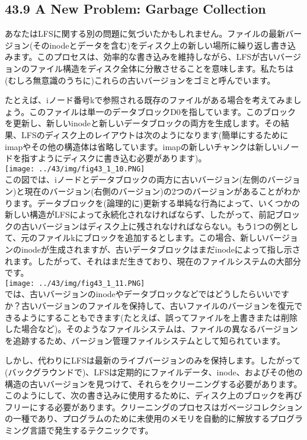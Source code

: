 \hypertarget{a-new-problem-garbage-collection}{%
\subsection*{43.9 A New Problem: Garbage
Collection}\label{a-new-problem-garbage-collection}}

あなたはLFSに関する別の問題に気づいたかもしれません。ファイルの最新バージョン(そのinodeとデータを含む)をディスク上の新しい場所に繰り返し書き込みます。このプロセスは、効率的な書き込みを維持しながら、LFSが古いバージョンのファイル構造をディスク全体に分散させることを意味します。私たちは(むしろ無意識のうちに)これらの古いバージョンをゴミと呼んでいます。

たとえば、iノード番号kで参照される既存のファイルがある場合を考えてみましょう。このファイルは単一のデータブロックD0を指しています。このブロックを更新し、新しいinodeと新しいデータブロックの両方を生成します。その結果、LFSのディスク上のレイアウトは次のようになります(簡単にするためにimapやその他の構造体は省略しています。imapの新しいチャンクは新しいiノードを指すようにディスクに書き込む必要があります)。\\
\texttt{[image: ../43/img/fig43\_1\_10.PNG]}\\
この図では、iノードとデータブロックの両方に古いバージョン(左側のバージョン)と現在のバージョン(右側のバージョン)の2つのバージョンがあることがわかります。データブロックを(論理的に)更新する単純な行為によって、いくつかの新しい構造がLFSによって永続化されなければならず、したがって、前記ブロックの古いバージョンはディスク上に残されなければならない。もう1つの例として、元のファイルkにブロックを追加するとします。この場合、新しいバージョンのinodeが生成されますが、古いデータブロックはまだinodeによって指し示されます。したがって、それはまだ生きており、現在のファイルシステムの大部分です。\\
\texttt{[image: ../43/img/fig43\_1\_11.PNG]}\\
では、古いバージョンのinodeやデータブロックなどではどうしたらいいですか？古いバージョンのファイルを保持して、古いファイルのバージョンを復元できるようにすることもできます(たとえば、誤ってファイルを上書きまたは削除した場合など)。そのようなファイルシステムは、ファイルの異なるバージョンを追跡するため、バージョン管理ファイルシステムとして知られています。

しかし、代わりにLFSは最新のライブバージョンのみを保持します。したがって(バックグラウンドで)、LFSは定期的にファイルデータ、inode、およびその他の構造の古いバージョンを見つけて、それらをクリーニングする必要があります。このようにして、次の書き込みに使用するために、ディスク上のブロックを再びフリーにする必要があります。クリーニングのプロセスはガベージコレクションの一種であり、プログラムのために未使用のメモリを自動的に解放するプログラミング言語で発生するテクニックです。

